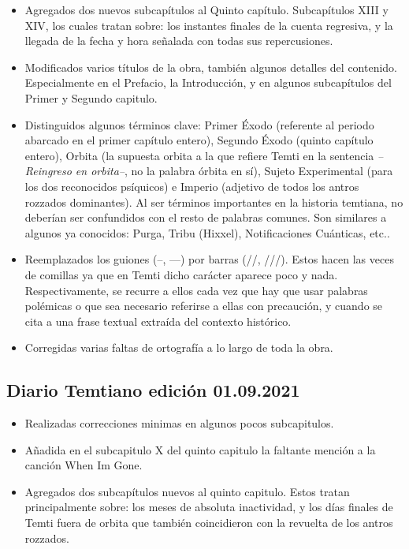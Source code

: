 \documentclass[
]{book}
\begin{document}
\begin{itemize}
\item
  Agregados dos nuevos subcapítulos al Quinto capítulo. Subcapítulos XIII y XIV, los cuales tratan sobre: los instantes finales de la cuenta regresiva, y la llegada de la fecha y hora señalada con todas sus repercusiones.
\item
  Modificados varios títulos de la obra, también algunos detalles del contenido. Especialmente en el Prefacio, la Introducción, y en algunos subcapítulos del Primer y Segundo capitulo.
\item
  Distinguidos algunos términos clave: Primer Éxodo (referente al periodo abarcado en el primer capítulo entero), Segundo Éxodo (quinto capítulo entero), Orbita (la supuesta orbita a la que refiere Temti en la sentencia \emph{--Reingreso en orbita--}, no la palabra órbita en sí), Sujeto Experimental (para los dos reconocidos psíquicos) e Imperio (adjetivo de todos los antros rozzados dominantes). Al ser términos importantes en la historia temtiana, no deberían ser confundidos con el resto de palabras comunes. Son similares a algunos ya conocidos: Purga, Tribu (Hixxel), Notificaciones Cuánticas, etc..
\item
  Reemplazados los guiones (--, ---) por barras (//, ///). Estos hacen las veces de comillas ya que en Temti dicho carácter aparece poco y nada. Respectivamente, se recurre a ellos cada vez que hay que usar palabras polémicas o que sea necesario referirse a ellas con precaución, y cuando se cita a una frase textual extraída del contexto histórico.
\item
  Corregidas varias faltas de ortografía a lo largo de toda la obra.
\end{itemize}

\hypertarget{diario-temtiano-ediciuxf3n-01.09.2021}{%
\subsection*{Diario Temtiano edición 01.09.2021}\label{diario-temtiano-ediciuxf3n-01.09.2021}}

\begin{itemize}
\item
  Realizadas correcciones minimas en algunos pocos subcapitulos.
\item
  Añadida en el subcapitulo X del quinto capitulo la faltante mención a la canción When Im Gone.
\item
  Agregados dos subcapítulos nuevos al quinto capitulo. Estos tratan principalmente sobre: los meses de absoluta inactividad, y los días finales de Temti fuera de orbita que también coincidieron con la revuelta de los antros rozzados.
\end{itemize}
\end{document}
